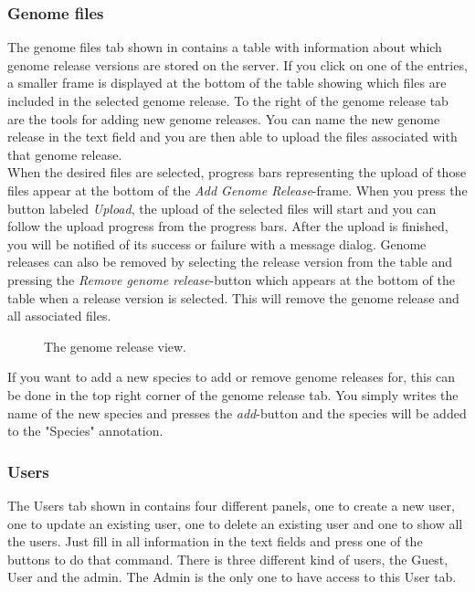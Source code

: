 \subsubsection{Genome files}


The genome files tab shown in  contains a table with information about which genome release versions are stored on the server. If you click on one of the entries, a smaller frame is displayed at the bottom of the table showing which files are included in the selected genome release. To the right of the genome release tab are the tools for adding new genome releases. You can name the new genome release in the text field and you are then able to upload the files associated with that genome release. \\

When the desired files are selected, progress bars representing the upload of those files appear at the bottom of the \textit{Add Genome Release}-frame. When you press the button labeled \textit{Upload}, the upload of the selected files will start and you can follow the upload progress from the progress bars. After the upload is finished, you will be notified of its success or failure with a message dialog.
Genome releases can also be removed by selecting the release version from the table and pressing the \textit{Remove genome release}-button which appears at the bottom of the table when a release version is selected. This will remove the genome release and all associated files.

\begin{figure}[h!]
\caption{The genome release view.}
\label{fig:adm_desktopGenomeTab}
\end{figure}

If you want to add a new species to add or remove genome releases for, this can be done in the top right corner of the genome release tab. You simply writes the name of the new species and presses the \textit{add}-button and the species will be added to the "Species" annotation.


\subsubsection{Users}

The Users tab shown in  contains four different panels, one to create a new user, one to update an existing user, one to delete an existing user and one to show all the users. Just fill in all information in the text fields and press one of the buttons to do that command. There is three different kind of users, the Guest, User and the admin. The Admin is the only one to have access to this User tab.


